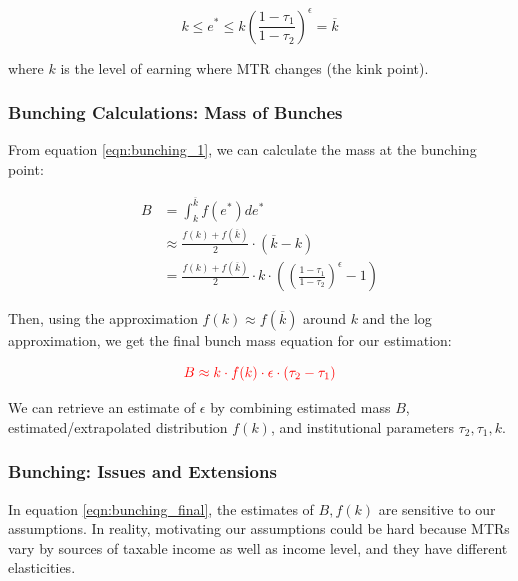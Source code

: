                 \begin{equation}
                    k \leq e^\ast \leq k \left( \frac{1-\tau_1}{1-\tau_2} \right)^\epsilon = \overline{k}
                    \label{eqn:bunching_1}
                \end{equation}

                where $k$ is the level of earning where MTR changes (the kink point).

            \subsubsection{Bunching Calculations: Mass of Bunches}

                From equation \ref{eqn:bunching_1}, we can calculate the mass at the bunching point:

                \begin{align*}
                    B &= \int_{k}^{\overline{k}} f(e^\ast) de^\ast \\
                    &\approx \frac{f(k)+f(\overline{k})}{2} \cdot (\overline{k}-k) \\
                    &= \frac{f(k)+f(\overline{k})}{2} \cdot k \cdot \left( \left( \frac{1-\tau_1}{1-\tau_2} \right)^\epsilon - 1 \right)
                \end{align*}

                Then, using the approximation $f(k) \approx f(\overline{k})$ around $k$ and the log approximation, we get the final bunch mass equation for our estimation:

                \begin{equation}
                    \color{red}
                    B \approx k\cdot f(k) \cdot \epsilon \cdot (\tau_2 - \tau_1)
                    \label{eqn:bunching_final}
                \end{equation}

                We can retrieve an estimate of $\epsilon$ by combining estimated mass $B$, estimated/extrapolated distribution $f(k)$, and institutional parameters $\tau_2,\tau_1,k$.

            \subsubsection{Bunching: Issues and Extensions}

                In equation \ref{eqn:bunching_final}, the estimates of $B,f(k)$ are sensitive to our assumptions. In reality, motivating our assumptions could be hard because MTRs vary by sources of taxable income as well as income level, and they have different elasticities.

